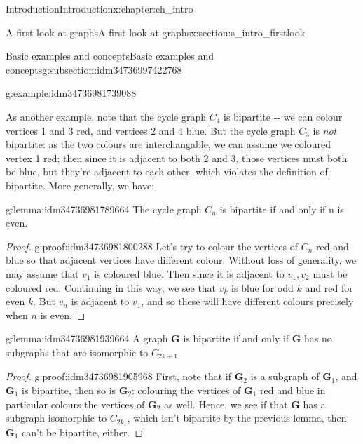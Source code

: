 \documentclass[oneside,10pt,]{book}
\numberwithin{equation}{section}
\newcommand{\bfG}{\mathbf{G}}
\begin{document}
\begin{chapterptx}{Introduction}{}{Introduction}{}{}{x:chapter:ch_intro}
\begin{sectionptx}{A first look at graphs}{}{A first look at graphs}{}{}{x:section:s_intro_firstlook}
\begin{subsectionptx}{Basic examples and concepts}{}{Basic examples and concepts}{}{}{g:subsection:idm34736997422768}
\begin{example}{}{g:example:idm34736981739088}
\begin{image}{0.05}{0.9}{0.05}
{\begin{tikzpicture}
\end{tikzpicture}
}%
\end{image}%
\end{example}
As another example, note that the cycle graph \(C_4\) is bipartite -{}-{} we can colour vertices 1 and 3 red, and vertices 2 and 4 blue.  But the cycle graph \(C_3\) is \emph{not} bipartite: as the two colours are interchangable, we can assume we coloured vertex 1 red; then since it is adjacent to both 2 and 3, those vertices must both be blue, but they're adjacent to each other, which violates the definition of bipartite.  More generally, we have:%
\begin{lemma}{}{}{g:lemma:idm34736981789664}%
The cycle graph \(C_n\) is bipartite if and only if n is even.%
\end{lemma}
\begin{proof}{}{g:proof:idm34736981800288}
Let's try to colour the vertices of \(C_n\) red and blue so that adjacent vertices have different colour.  Without loss of generality, we may assume that \(v_1\) is coloured blue.  Then since it is adjacent to \(v_1, v_2\) must be coloured red.  Continuing in this way, we see that \(v_k\) is blue for odd \(k\) and red for even \(k\).  But \(v_n\) is adjacent to \(v_1\), and so these will have different colours precisely when \(n\) is even.%
\end{proof}
\begin{lemma}{}{}{g:lemma:idm34736981939664}%
A graph \(\bfG\) is bipartite if and only if \(\bfG\) has no subgraphs that are isomorphic to \(C_{2k+1}\)%
\end{lemma}
\begin{proof}{}{g:proof:idm34736981905968}
First, note that if \(\bfG_2\) is a subgraph of \(\bfG_1\), and \(\bfG_1\) is bipartite, then so is \(\bfG_2\): colouring the vertices of \(\bfG_1\) red and blue in particular colours the vertices of \(\bfG_2\) as well.  Hence, we see if that \(\bfG\) has a subgraph isomorphic to \(C_{2k_1}\), which isn't bipartite by the previous lemma, then \(\bfG_1\) can't be bipartite, either.%
\par

\end{proof}
\end{subsectionptx}
\end{sectionptx}
\end{chapterptx}
\end{document}
